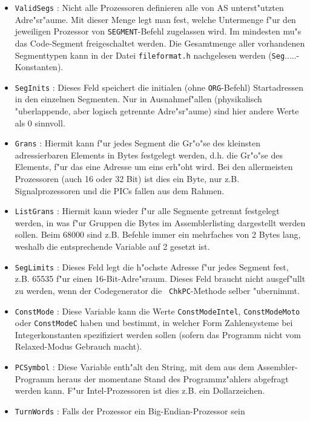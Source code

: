 \documentclass[12pt,a4paper,twoside]{report}
\newcommand{\tty}[1]{{\tt #1}}
\begin{document}
\begin{itemize}
\item{\tty{ValidSegs} : Nicht alle Prozessoren definieren alle von AS
      unterst"utzten Adre"sr"aume.  Mit dieser Menge legt man fest,
      welche Untermenge f"ur den jeweiligen Prozessor von \tty{SEGMENT}-Befehl
      zugelassen wird.  Im mindesten mu"s das Code-Segment freigeschaltet
      werden.  Die Gesamtmenge aller vorhandenen Segmenttypen kann in der
      Datei \tty{fileformat.h} nachgelesen werden (\tty{Seg}.....-Konstanten).}
\item{\tty{SegInits} : Dieses Feld speichert die initialen (ohne \tty{ORG}-Befehl)
      Startadressen in den einzelnen Segmenten.  Nur in Ausnahmef"allen
      (physikalisch "uberlappende, aber logisch getrennte Adre"sr"aume)
      sind hier andere Werte als 0 sinnvoll.}
\item{\tty{Grans} : Hiermit kann f"ur jedes Segment die Gr"o"se des kleinsten
      adressierbaren Elements in Bytes festgelegt werden, d.h. die
      Gr"o"se des Elements, f"ur das eine Adresse um eins erh"oht wird.
      Bei den allermeisten Prozessoren (auch 16 oder 32 Bit) ist dies
      ein Byte, nur z.B. Signalprozessoren und die PICs fallen aus dem
      Rahmen.}
\item{\tty{ListGrans} : Hiermit kann wieder f"ur alle Segmente getrennt
      festgelegt werden, in was f"ur Gruppen die Bytes im Assemblerlisting
      dargestellt werden sollen.  Beim 68000 sind z.B. Befehle immer
      ein mehrfaches von 2 Bytes lang, weshalb die entsprechende Variable
      auf 2 gesetzt ist.}
\item{\tty{SegLimits} : Dieses Feld legt die h"ochste Adresse f"ur jedes
      Segment fest, z.B. 65535 f"ur einen 16-Bit-Adre"sraum.  Dieses Feld
      braucht nicht ausgef"ullt zu werden, wenn der Codegenerator die {\tt
      ChkPC}-Methode selber "ubernimmt.}
\item{\tty{ConstMode} : Diese Variable kann die Werte \tty{ConstModeIntel},
      \tty{ConstModeMoto} oder \tty{ConstModeC} haben und bestimmt, in
      welcher Form Zahlensysteme bei Integerkonstanten spezifiziert werden
      sollen (sofern das Programm nicht vom Relaxed-Modus Gebrauch macht).}
\item{\tty{PCSymbol} : Diese Variable enth"alt den String, mit dem aus dem
      Assembler-Programm heraus der momentane Stand des Programmz"ahlers
      abgefragt werden kann.  F"ur Intel-Prozessoren ist dies z.B. ein
      Dollarzeichen.}
\item{\tty{TurnWords} : Falls der Prozessor ein Big-Endian-Prozessor sein
}
\end{itemize}
\end{document}
